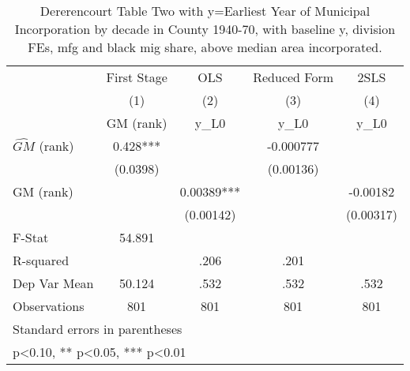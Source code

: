 \begin{table}[htbp]\centering
\def\sym#1{\ifmmode^{#1}\else\(^{#1}\)\fi}
\caption{Dererencourt Table Two with y=Earliest Year of Municipal Incorporation by decade in County 1940-70, with baseline y, division FEs, mfg and black mig share, above median area incorporated.}
\begin{tabular}{l*{4}{c}}
\toprule
                    & First Stage   &         OLS   &Reduced Form   &        2SLS   \\
                    &\multicolumn{1}{c}{(1)}&\multicolumn{1}{c}{(2)}&\multicolumn{1}{c}{(3)}&\multicolumn{1}{c}{(4)}\\
                    &\multicolumn{1}{c}{GM  (rank)}&\multicolumn{1}{c}{y\_L0}&\multicolumn{1}{c}{y\_L0}&\multicolumn{1}{c}{y\_L0}\\
\midrule
$\hat{GM}$ (rank)   &       0.428***&               &   -0.000777   &               \\
                    &    (0.0398)   &               &   (0.00136)   &               \\
\addlinespace
GM  (rank)          &               &     0.00389***&               &    -0.00182   \\
                    &               &   (0.00142)   &               &   (0.00317)   \\
\midrule
F-Stat              &      54.891   &               &               &               \\
R-squared           &               &        .206   &        .201   &               \\
Dep Var Mean        &      50.124   &        .532   &        .532   &        .532   \\
Observations        &         801   &         801   &         801   &         801   \\
\bottomrule
\multicolumn{5}{l}{\footnotesize Standard errors in parentheses}\\
\multicolumn{5}{l}{\footnotesize * p<0.10, ** p<0.05, *** p<0.01}\\
\end{tabular}
\end{table}
